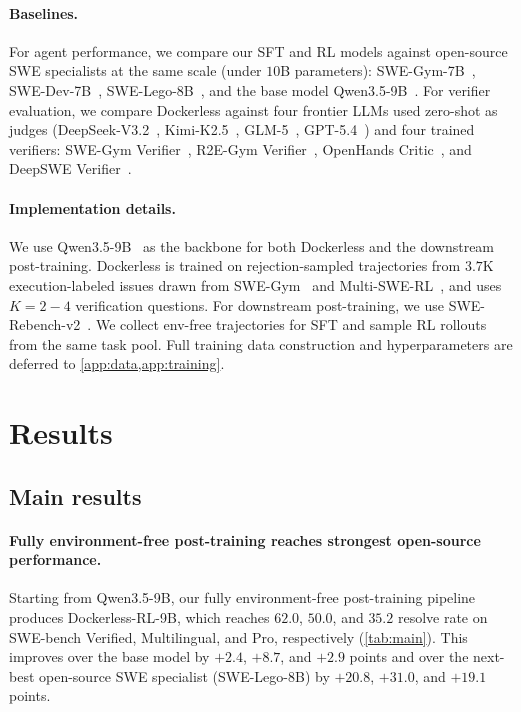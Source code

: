 \documentclass[]{arxiv_template}
\newcommand{\approach}{Dockerless\xspace}
\begin{document}
\paragraph{Baselines.}
For agent performance, we compare our SFT and RL models against open-source SWE specialists at the same scale (under $10$B parameters): SWE-Gym-7B~\citep{pan2025training}, SWE-Dev-7B~\citep{wang2025swedev}, SWE-Lego-8B~\citep{tao2026swelego}, and the base model Qwen3.5-9B~\citep{team2026qwen35}.
For verifier evaluation, we compare \approach against four frontier LLMs used zero-shot as judges (DeepSeek-V3.2~\citep{liu2025deepseek}, Kimi-K2.5~\citep{team2026kimi}, GLM-5~\citep{zeng2026glm}, GPT-5.4~\citep{openai2026gpt54}) and four trained verifiers: SWE-Gym Verifier~\citep{pan2025training}, R2E-Gym Verifier~\citep{jain2025r2e}, OpenHands Critic~\citep{wang2026rubric}, and DeepSWE Verifier~\citep{luo2025deepswe}.

\paragraph{Implementation details.}
We use Qwen3.5-9B~\citep{team2026qwen35} as the backbone for both \approach and the downstream post-training.
\approach is trained on rejection-sampled trajectories from $3.7$K execution-labeled issues drawn from SWE-Gym~\citep{pan2025training} and Multi-SWE-RL~\citep{zan2026multi}, and uses $K{=}2-4$ verification questions.
For downstream post-training, we use SWE-Rebench-v2~\citep{badertdinov2026swev2}. We collect env-free trajectories for SFT and sample RL rollouts from the same task pool.
Full training data construction and hyperparameters are deferred to \cref{app:data,app:training}.

\section{Results}

\subsection{Main results}
\label{sec:main-results}

\paragraph{Fully environment-free post-training reaches strongest open-source performance.}
Starting from Qwen3.5-9B, our fully environment-free post-training pipeline produces \approach-RL-9B, which reaches $62.0$, $50.0$, and $35.2$ resolve rate on SWE-bench Verified, Multilingual, and Pro, respectively (\cref{tab:main}).
This improves over the base model by $+2.4$, $+8.7$, and $+2.9$ points and over the next-best open-source SWE specialist (SWE-Lego-8B) by $+20.8$, $+31.0$, and $+19.1$ points.
\end{document}
